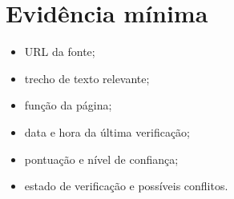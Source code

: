 \section{Evidência mínima}

\begin{itemize}[leftmargin=*,itemsep=0.25em]
\item URL da fonte;
\item trecho de texto relevante;
\item função da página;
\item data e hora da última verificação;
\item pontuação e nível de confiança;
\item estado de verificação e possíveis conflitos.
\end{itemize}
